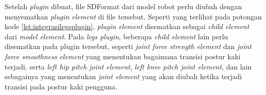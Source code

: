 Setelah \emph{plugin} dibuat,
  file SDFormat dari model robot perlu diubah dengan menyematkan \emph{plugin element} di file tersebut.
Seperti yang terlihat pada potongan kode \ref{lst:integrasilegsplugin},
  \emph{plugin element} disematkan sebagai \emph{child element} dari \emph{model element}.
Pada \emph{legs plugin},
  beberapa \emph{child element} lain perlu disematkan pada plugin tersebut,
  seperti \emph{joint force strength element} dan \emph{joint force smoothness element} yang menentukan bagaimana transisi postur kaki terjadi,
  serta \emph{left hip pitch joint element}, \emph{left knee pitch joint element}, dan lain sebagainya yang menentukan \emph{joint element} yang akan diubah ketika terjadi transisi pada postur kaki pengguna.


